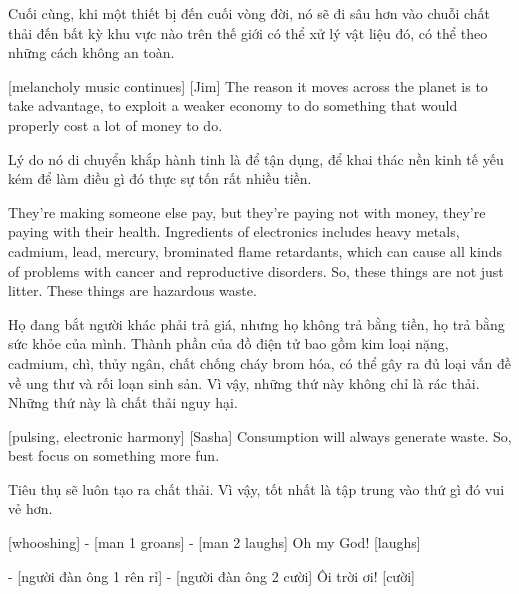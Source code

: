 \documentclass[a4paper]{article}
\begin{document}
	\begin{vietnamese-v2}
		Cuối cùng, khi một thiết bị đến cuối vòng đời, nó sẽ đi sâu hơn vào chuỗi chất thải đến bất kỳ khu vực nào trên thế giới có thể xử lý vật liệu đó, có thể theo những cách không an toàn.
	\end{vietnamese-v2}
	
	[melancholy music continues]
	[Jim] The reason it moves across the planet is to take advantage, to exploit a weaker economy to do something that would properly cost a lot of money to do.
	
	\begin{vietnamese-v2}
		 Lý do nó di chuyển khắp hành tinh là để tận dụng, để khai thác nền kinh tế yếu kém để làm điều gì đó thực sự tốn rất nhiều tiền.
	\end{vietnamese-v2}
	
	They're making someone else pay, but they're paying not with money, they're paying with their health.
	Ingredients of electronics includes heavy metals, cadmium, lead, mercury, brominated flame retardants, which can cause all kinds of problems with cancer and reproductive disorders.
	So, these things are not just litter. These things are hazardous waste.
	
	\begin{vietnamese-v2}
		Họ đang bắt người khác phải trả giá, nhưng họ không trả bằng tiền, họ trả bằng sức khỏe của mình.
		Thành phần của đồ điện tử bao gồm kim loại nặng, cadmium, chì, thủy ngân, chất chống cháy brom hóa, có thể gây ra đủ loại vấn đề về ung thư và rối loạn sinh sản.
		Vì vậy, những thứ này không chỉ là rác thải. Những thứ này là chất thải nguy hại.
	\end{vietnamese-v2}
	
	[pulsing, electronic harmony]
	[Sasha] Consumption will always generate waste.
	So, best focus on something more fun.
	
	\begin{vietnamese-v2}
		 Tiêu thụ sẽ luôn tạo ra chất thải.
		Vì vậy, tốt nhất là tập trung vào thứ gì đó vui vẻ hơn.
	\end{vietnamese-v2}
	
	[whooshing]
	- [man 1 groans] - [man 2 laughs]
	Oh my God! [laughs]
	
	\begin{vietnamese-v2}
		[vù vù]
		- [người đàn ông 1 rên rỉ] - [người đàn ông 2 cười]
		Ôi trời ơi! [cười]
	\end{vietnamese-v2}
	
\end{document}
